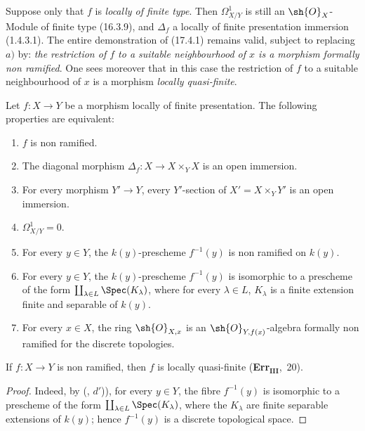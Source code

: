 \begin{remark}[17.4.2]
\label{IV.17.4.2}
Suppose only that $f$ is \emph{locally of finite type}.
Then $\Omega^1_{X/Y}$ is still an $\sh{O}_X$-Module of finite type (16.3.9), and $\Delta_f$ a locally of finite presentation immersion (1.4.3.1).
The entire demonstration of (17.4.1) remains valid, subject to replacing $a)$ by: \emph{the restriction of $f$ to a suitable neighbourhood of $x$ is a morphism formally non ramified}.
One sees moreover that in this case the restriction of $f$ to a suitable neighbourhood of $x$ is a morphism \emph{locally quasi-finite}.
\end{remark}

\begin{corollary}[17.4.2]
\label{IV.17.4.2.cor}
Let $f:X\to Y$ be a morphism locally of finite presentation.
The following properties are equivalent:
\begin{enumerate}[label=(\alph*)]
  \item $f$ is non ramified.
  \item The diagonal morphism $\Delta_f:X\to X\times_Y X$ is an open immersion.
  \item[b')] For every morphism $Y'\to Y$, every $Y'$-section of $X'=X\times_Y Y'$ is an open immersion.
  \item $\Omega^1_{X/Y}=0$.
  \item For every $y\in Y$, the $k(y)$-prescheme $f^{-1}(y)$ is non ramified on $k(y)$.
  \item[d')] For every $y\in Y$, the $k(y)$-prescheme $f^{-1}(y)$ is isomorphic to a prescheme of the form $\coprod_{\lambda\in L}\Spec(K_\lambda)$, where for every $\lambda\in L$, $K_\lambda$ is a finite extension finite and separable of $k(y)$.
  \item For every $x\in X$, the ring $\sh{O}_{X,x}$ is an $\sh{O}_{Y,f(x)}$-algebra formally non ramified for the discrete topologies.
\end{enumerate}
\end{corollary}

\begin{corollary}[17.4.3]
\label{IV.17.4.3}
If $f:X\to Y$ is non ramified, then $f$ is locally quasi-finite (\textbf{Err}$_\textbf{III}$,~20).
\end{corollary}

\begin{proof}
Indeed, by (, $d'$)), for every $y\in Y$, the fibre $f^{-1}(y)$ is isomorphic to a prescheme of the form $\coprod_{\lambda\in L}\Spec(K_\lambda)$, where the $K_\lambda$ are finite separable extensions of $k(y)$; hence $f^{-1}(y)$ is a discrete topological space.
\end{proof}

